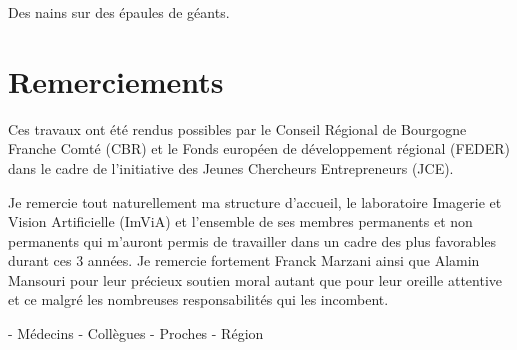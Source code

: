 \documentclass[english,standardlists]{spimubphdthesis}
\begin{document}
\dominitoc



	\parbox[t]{\textwidth}{
	\vspace{1.5cm}
		\begin{fquote}
			Des nains sur des épaules de géants.
		\end{fquote}	
	}
	
\chapter*{Remerciements}
Ces travaux ont été rendus possibles par le Conseil Régional de Bourgogne Franche Comté (CBR) et le Fonds européen de développement régional (FEDER) dans le cadre de l'initiative des Jeunes Chercheurs Entrepreneurs (JCE).\par
Je remercie tout naturellement ma structure d'accueil, le laboratoire Imagerie et Vision Artificielle (ImViA) et l'ensemble de ses membres permanents et non permanents qui m'auront permis de travailler dans un cadre des plus favorables durant ces 3 années. Je remercie fortement Franck Marzani ainsi que Alamin Mansouri pour leur précieux soutien moral autant que pour leur oreille attentive et ce malgré les nombreuses responsabilités qui les incombent.\par
- Médecins
- Collègues
- Proches
- Région
\end{document}
